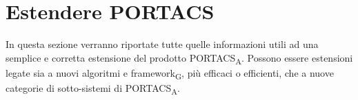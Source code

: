 \section{Estendere PORTACS}
In questa sezione verranno riportate tutte quelle informazioni utili ad una semplice e corretta estensione del prodotto PORTACS\textsubscript{A}. Possono essere estensioni legate sia a nuovi algoritmi e framework\textsubscript{G}, più efficaci o efficienti, che a nuove categorie di sotto-sistemi di PORTACS\textsubscript{A}.














